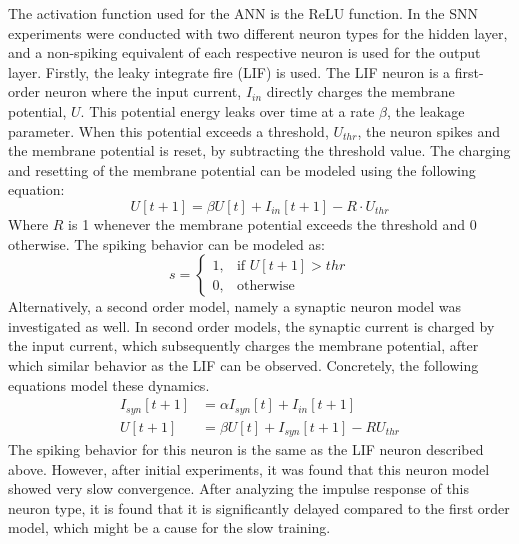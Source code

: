The activation function used for the ANN is the ReLU function. In the SNN experiments were conducted with two different neuron types for the hidden layer, and a non-spiking equivalent of each respective neuron is used for the output layer. Firstly, the leaky integrate fire (LIF) is used. The LIF neuron is a first-order neuron where the input current, $I_{in}$ directly charges the membrane potential, $U$. This potential energy leaks over time at a rate $\beta$, the leakage parameter. When this potential exceeds a threshold, $U_{thr}$, the neuron spikes and the membrane potential is reset, by subtracting the threshold value. The charging and resetting of the membrane potential can be modeled using the following equation:
\begin{equation}
    U[t+1] = \beta U[t] + I_{in}[t+1] - R\cdot U_{thr}
\end{equation}
Where $R$ is 1 whenever the membrane potential exceeds the threshold and 0 otherwise.
The spiking behavior can be modeled as:
\begin{equation}
    s = \begin{cases}
           1,& \text{if } U[t+1] > thr\\
    0,              & \text{otherwise} 
    \end{cases}
\end{equation}
Alternatively, a second order model, namely a synaptic neuron model was investigated as well. In second order models, the synaptic current is charged by the input current, which subsequently charges the membrane potential, after which similar behavior as the LIF can be observed. Concretely, the following equations model these dynamics.
\begin{align}
    I_{syn}[t+1] &= \alpha I_{syn}[t] + I_{in}[t+1]\\
    U[t+1] &= \beta U[t] + I_{syn}[t+1] - R U_{thr}
\end{align}
The spiking behavior for this neuron is the same as the LIF neuron described above. However, after initial experiments, it was found that this neuron model showed very slow convergence. After analyzing the impulse response of this neuron type, it is found that it is significantly delayed compared to the first order model, which might be a cause for the slow training.\\

